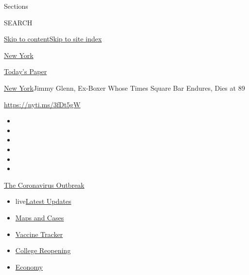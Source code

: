 Sections

SEARCH

\protect\hyperlink{site-content}{Skip to
content}\protect\hyperlink{site-index}{Skip to site index}

\href{https://www.nytimes.com/section/nyregion}{New York}

\href{https://myaccount.nytimes.com/auth/login?response_type=cookie\&client_id=vi}{}

\href{https://www.nytimes.com/section/todayspaper}{Today's Paper}

\href{/section/nyregion}{New York}\textbar{}Jimmy Glenn, Ex-Boxer Whose
Times Square Bar Endures, Dies at 89

\url{https://nyti.ms/3fDt5gW}

\begin{itemize}
\item
\item
\item
\item
\item
\item
\end{itemize}

\href{https://www.nytimes.com/news-event/coronavirus?action=click\&pgtype=Article\&state=default\&region=TOP_BANNER\&context=storylines_menu}{The
Coronavirus Outbreak}

\begin{itemize}
\tightlist
\item
  live\href{https://www.nytimes.com/2020/08/03/world/coronavirus-covid-19.html?action=click\&pgtype=Article\&state=default\&region=TOP_BANNER\&context=storylines_menu}{Latest
  Updates}
\item
  \href{https://www.nytimes.com/interactive/2020/us/coronavirus-us-cases.html?action=click\&pgtype=Article\&state=default\&region=TOP_BANNER\&context=storylines_menu}{Maps
  and Cases}
\item
  \href{https://www.nytimes.com/interactive/2020/science/coronavirus-vaccine-tracker.html?action=click\&pgtype=Article\&state=default\&region=TOP_BANNER\&context=storylines_menu}{Vaccine
  Tracker}
\item
  \href{https://www.nytimes.com/2020/08/02/us/covid-college-reopening.html?action=click\&pgtype=Article\&state=default\&region=TOP_BANNER\&context=storylines_menu}{College
  Reopening}
\item
  \href{https://www.nytimes.com/live/2020/08/03/business/stock-market-today-coronavirus?action=click\&pgtype=Article\&state=default\&region=TOP_BANNER\&context=storylines_menu}{Economy}
\end{itemize}

